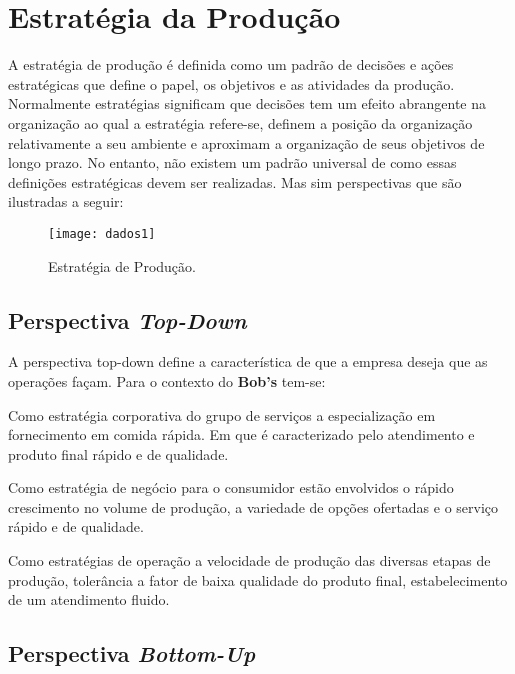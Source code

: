 	\section[Estratégia da Produção]{Estratégia da Produção}
	\label{sec:dados_estrategia}

		A estratégia de produção é definida como um padrão de decisões e ações estratégicas que define o papel, os objetivos e as atividades da produção. Normalmente estratégias significam que decisões tem um efeito abrangente na organização ao qual a estratégia refere-se, definem a posição da organização relativamente a seu ambiente e aproximam a organização de seus objetivos de longo prazo. No entanto, não existem um padrão universal de como essas definições estratégicas devem ser realizadas. Mas sim perspectivas que são ilustradas a seguir:

		\begin{figure}[h]
			\centering
			\texttt{[image: dados1]}
			\caption[Estratégia de Produção]{Estratégia de Produção. \cite{slack}}
			\label{fig:dados1}
		\end{figure}

		\subsection[Perspectiva Top-Down]{Perspectiva \emph{Top-Down}}
		\label{sec:dados_perspNorte}

			A perspectiva top-down define a característica de que a empresa deseja que as operações façam. Para o contexto do \textbf{Bob’s} tem-se:

			Como estratégia corporativa do grupo de serviços a especialização em fornecimento em comida rápida. Em que é caracterizado pelo atendimento e produto final rápido e de qualidade.

			Como estratégia de negócio para o consumidor estão envolvidos o rápido crescimento no volume de produção, a variedade de opções ofertadas e o serviço rápido e de qualidade.

			Como estratégias de operação a velocidade de produção das diversas etapas de produção, tolerância a fator de baixa qualidade do produto final, estabelecimento de um atendimento fluido.

		\subsection[Perspectiva Bottom-Up]{Perspectiva \emph{Bottom-Up}}
		\label{sec:dados_perspSul}

